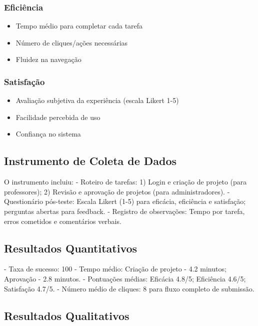 \documentclass[12pt, a4paper]{report}
\begin{document}
\subsubsection{Eficiência}
\begin{itemize}
    \item Tempo médio para completar cada tarefa
    \item Número de cliques/ações necessárias
    \item Fluidez na navegação
\end{itemize}

\subsubsection{Satisfação}
\begin{itemize}
    \item Avaliação subjetiva da experiência (escala Likert 1-5)
    \item Facilidade percebida de uso
    \item Confiança no sistema
\end{itemize}

\subsection{Instrumento de Coleta de Dados}

O instrumento incluiu:
- Roteiro de tarefas: 1) Login e criação de projeto (para professores); 2) Revisão e aprovação de projetos (para administradores).
- Questionário pós-teste: Escala Likert (1-5) para eficácia, eficiência e satisfação; perguntas abertas para feedback.
- Registro de observações: Tempo por tarefa, erros cometidos e comentários verbais.

\subsection{Resultados Quantitativos}

- Taxa de sucesso: 100%
- Tempo médio: Criação de projeto - 4.2 minutos; Aprovação - 2.8 minutos.
- Pontuações médias: Eficácia 4.8/5; Eficiência 4.6/5; Satisfação 4.7/5.
- Número médio de cliques: 8 para fluxo completo de submissão.

\subsection{Resultados Qualitativos}
\end{document}
